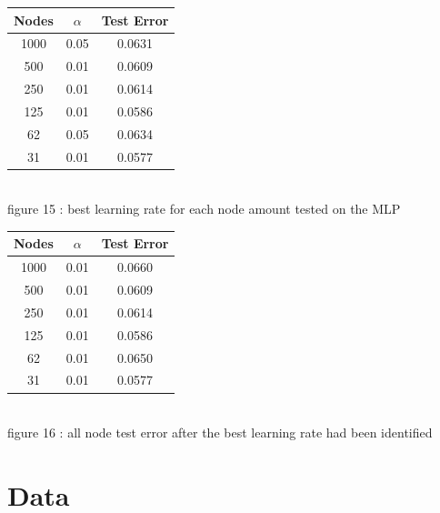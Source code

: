 \documentclass{IEEEtran}[11pt]
\begin{document}
\begin{flushleft}
  \begin{center}
    \begin{tabular}{||c c c||}
      \hline
      Nodes & $\alpha $ & Test Error \\ [0.5ex]
      \hline
      1000 & 0.05 & 0.0631 \\
      500 & 0.01 &  0.0609 \\
      250 & 0.01 & 0.0614 \\
      125 & 0.01 & 0.0586\\
      62  & 0.05 & 0.0634\\
      31  & 0.01 & 0.0577\\
      \hline
    \end{tabular}
    \\
    \vspace{2.5mm}
    {\footnotesize figure 15 : best learning rate for each node amount tested on
    the MLP}
    \\
    \vspace{2.5mm}
  \end{center}
\begin{center}
  \begin{tabular}{||c c c||}
    \hline
    Nodes & $\alpha $  & Test Error \\ [0.5ex]
    \hline
    1000 & 0.01 & 0.0660 \\
    500 & 0.01 &  0.0609 \\
    250 & 0.01 & 0.0614 \\
    125 & 0.01 & 0.0586\\
    62  & 0.01 & 0.0650\\
    31  & 0.01 & 0.0577\\
    \hline
  \end{tabular}
  \\
  \vspace{2.5mm}
  {\footnotesize figure 16 : all node test error after the best learning rate
  had been identified}
\end{center}
\end{flushleft}
\section{Data}
\end{document}
